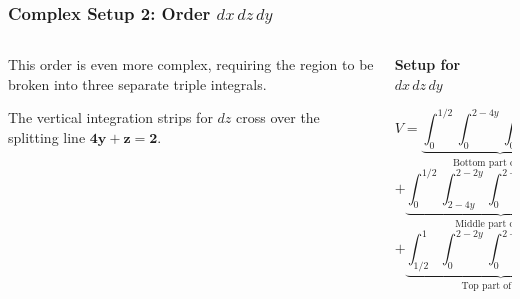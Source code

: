 \documentclass[aspectratio=169, UTF8]{beamer}
\begin{document}
\begin{frame}
    \frametitle{Complex Setup 2: Order $dx\,dz\,dy$}

    \begin{columns}[T]
        \begin{column}{0.5\textwidth}
            This order is even more complex, requiring the region to be broken into three separate triple integrals.
            \vspace{1em}

            The vertical integration strips for $dz$ cross over the splitting line $\mathbf{4y+z=2}$.

            \begin{center}
            \end{center}

        \end{column}

        \begin{column}{0.5\textwidth}
            \textbf{Setup for $dx\,dz\,dy$}
            \vspace{1em}

            {\small
                $$ V = \underbrace{\int_0^{1/2} \int_0^{2-4y} \int_0^{2y} dx\,dz\,dy}_{\text{Bottom part of region}} $$
                $$ + \underbrace{\int_0^{1/2} \int_{2-4y}^{2-2y} \int_0^{2-2y-z} dx\,dz\,dy}_{\text{Middle part of region}} $$
                $$ + \underbrace{\int_{1/2}^1 \int_0^{2-2y} \int_0^{2-2y-z} dx\,dz\,dy}_{\text{Top part of region}} $$
            }


        \end{column}

    \end{columns}
\end{frame}
\end{document}

